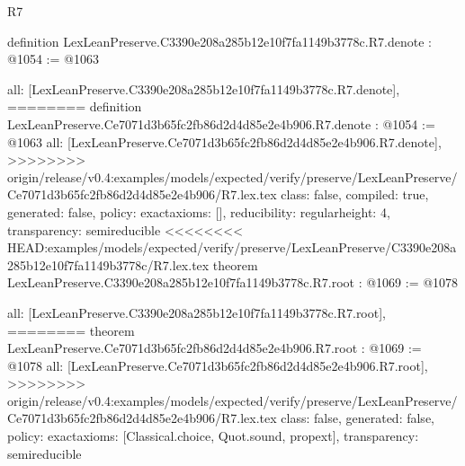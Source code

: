 \begin{lexlean}{R7}
\begin{coremodule}
{{{{{{{{{{{definition LexLeanPreserve.C3390e208a285b12e10f7fa1149b3778c.R7.denote : @1054 := @1063 {
  all: [LexLeanPreserve.C3390e208a285b12e10f7fa1149b3778c.R7.denote],
========
definition LexLeanPreserve.Ce7071d3b65fc2fb86d2d4d85e2e4b906.R7.denote : @1054 := @1063 {
  all: [LexLeanPreserve.Ce7071d3b65fc2fb86d2d4d85e2e4b906.R7.denote],
>>>>>>>> origin/release/v0.4:examples/models/expected/verify/preserve/LexLeanPreserve/Ce7071d3b65fc2fb86d2d4d85e2e4b906/R7.lex.tex
  class: false,
  compiled: true,
  generated: false,
  policy: exact{axioms: []},
  reducibility: regular{height: 4},
  transparency: semireducible
}
<<<<<<<< HEAD:examples/models/expected/verify/preserve/LexLeanPreserve/C3390e208a285b12e10f7fa1149b3778c/R7.lex.tex
theorem LexLeanPreserve.C3390e208a285b12e10f7fa1149b3778c.R7.root : @1069 := @1078 {
  all: [LexLeanPreserve.C3390e208a285b12e10f7fa1149b3778c.R7.root],
========
theorem LexLeanPreserve.Ce7071d3b65fc2fb86d2d4d85e2e4b906.R7.root : @1069 := @1078 {
  all: [LexLeanPreserve.Ce7071d3b65fc2fb86d2d4d85e2e4b906.R7.root],
>>>>>>>> origin/release/v0.4:examples/models/expected/verify/preserve/LexLeanPreserve/Ce7071d3b65fc2fb86d2d4d85e2e4b906/R7.lex.tex
  class: false,
  generated: false,
  policy: exact{axioms: [Classical.choice, Quot.sound, propext]},
  transparency: semireducible
}

}}}}}}}}}}}}}
\end{coremodule}
\end{lexlean}
